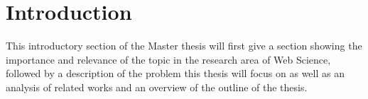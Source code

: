 
\chapter{Introduction} %
\label{cha:introduction}

This introductory section of the Master thesis will first give a section showing the importance and relevance of the topic in the research area of Web Science,
followed by a description of the problem this thesis will focus on as well as an analysis of related works and an overview of the outline of the thesis.







